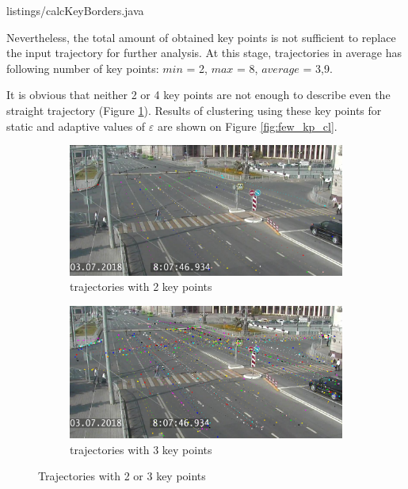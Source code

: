 {listings/calcKeyBorders.java}

Nevertheless, the total amount of obtained key points is not sufficient to replace the input trajectory for further analysis. At this stage, trajectories in average has following number of key points: $min$ = 2, $max$ = 8, $average$ = 3,9.

It is obvious that neither 2 or 4 key points are not enough to describe even the straight trajectory (Figure \ref{fig:2-3-kp}). Results of clustering using these key points for static and adaptive values of $\varepsilon$ are shown on Figure \ref{fig:few_kp_cl}.

\begin{figure}[!htb]
	\centering
	\begin{subfigure}[!htb]{0.48\textwidth}
		\centering{}
		\includegraphics[width=\textwidth]{images/2-kp.png}
		\caption{trajectories with 2 key points}
	\end{subfigure}
	\hfill
	\begin{subfigure}[!htb]{0.48\textwidth}
		\centering{}
		\includegraphics[width=\textwidth]{images/3-kp.png}
		\caption{trajectories with 3 key points}
	\end{subfigure}	
	\caption{Trajectories with 2 or 3 key points}
	\label{fig:2-3-kp}
\end{figure}

